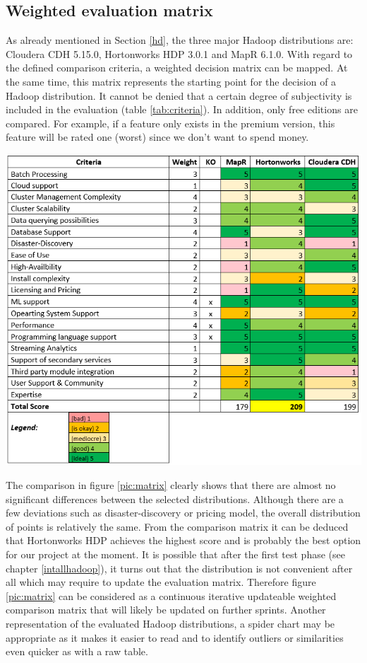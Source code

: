 \documentclass[12pt]{article}
\begin{document}
\subsection{Weighted evaluation matrix}\label{weight}
As already mentioned in Section \ref{hd}, the three major Hadoop distributions are: Cloudera CDH 5.15.0,
Hortonworks HDP 3.0.1 and MapR 6.1.0. With regard to the defined comparison criteria, a weighted
decision matrix can be mapped. At the same time, this matrix represents the starting point for the decision of a Hadoop distribution. It cannot be denied that a certain degree of subjectivity is included in the evaluation (table \ref{tab:criteria}). In addition, only free editions are compared. For example, if a feature only exists in the premium version, this feature will be rated one (worst) since we don’t want to spend money.
\begin{center}
\includegraphics[width=1.0\textwidth]{img/matrix}
\label{pic:matrix}
\end{center}
The comparison in figure \ref{pic:matrix} clearly shows that there are almost no significant differences between the selected distributions. Although there are a few deviations such as disaster-discovery or pricing model, the overall distribution of points is relatively the same. From the comparison matrix it can be deduced that Hortonworks HDP achieves the highest score and is probably the best option for our project at the moment. It is possible that after the first test phase (see chapter \ref{intallhadoop}), it turns out that the distribution is not convenient after all which may require to update the evaluation matrix. Therefore figure \ref{pic:matrix} can be considered as a continuous iterative updateable weighted comparison matrix that will likely be updated on further sprints. Another representation of the evaluated Hadoop distributions, a spider chart may be appropriate as it makes it easier to read and to identify outliers or similarities even quicker as with a raw table.
\end{document}
